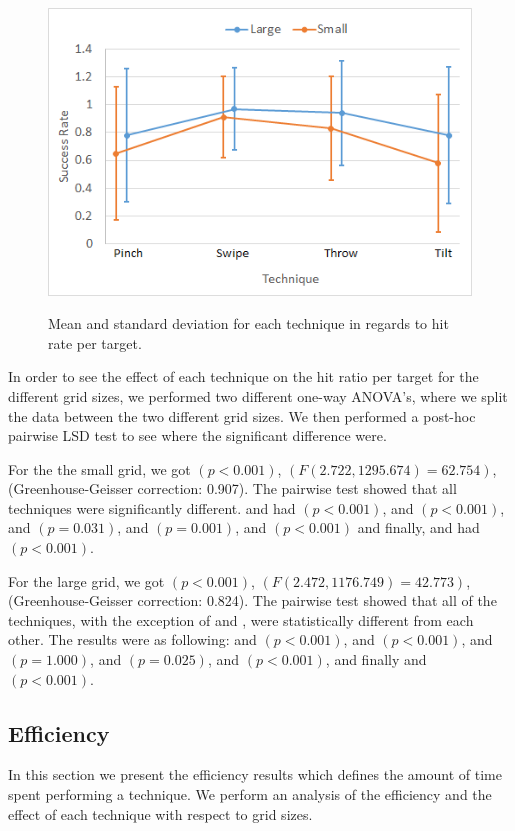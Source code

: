\begin{figure}[H]
	{\includegraphics[width = 1\columnwidth ]{images/success.png}} 
	\caption{
		Mean and standard deviation for each technique in regards to hit rate per target.
	}
	\label{fig:successResults}
\end{figure}

In order to see the effect of each technique on the hit ratio per target for the different grid sizes, we performed two different one-way ANOVA's, where we split the data between the two different grid sizes.
We then performed a post-hoc pairwise LSD test to see where the significant difference were.
 
For the the small grid, we got $(p<0.001)$, $(F(2.722, 1295.674)=62.754)$, (Greenhouse-Geisser correction: 0.907).
The pairwise test showed that all techniques were significantly different. \pinch and \swipe had $(p < 0.001)$, \pinch and \throw $(p <0.001)$, \pinch and \tilt $(p = 0.031)$, \swipe and \throw $(p=0.001)$, \swipe and \tilt $(p < 0.001)$ and finally, \throw and \tilt had $(p<0.001)$. 

For the large grid, we got $(p<0.001)$, $(F(2.472, 1176.749)=42.773)$, (Greenhouse-Geisser correction: 0.824).
The pairwise test showed that all of the techniques, with the exception of \pinch and \tilt, were statistically different from each other. The results were as following: \pinch and \swipe $(p<0.001)$, \pinch and \throw $(p<0.001)$, \pinch and \tilt $(p=1.000)$, \swipe and \throw $(p=0.025)$, \swipe and \tilt $(p<0.001)$, and finally \throw and \tilt $(p<0.001)$.

\subsection{Efficiency}
In this section we present the efficiency results which defines the amount of time spent performing a technique.
We perform an analysis of the efficiency and the effect of each technique with respect to grid sizes.

